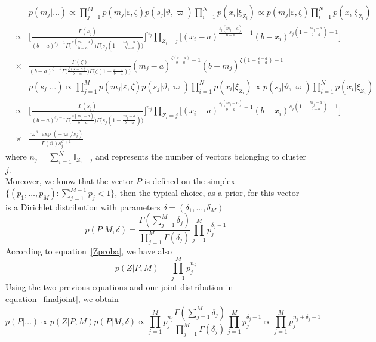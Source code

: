 \documentclass[journal,10pt]{elsart}
\begin{document}
\begin{eqnarray}\label{posteriormean}
\nonumber &&p(m_j|\ldots)\propto\prod_{j=1}^M p({m}_j|\varepsilon,\zeta)p(s_j|\vartheta,\varpi)\prod_{i=1}^Np(x_i|\xi_{Z_i})\propto p({m}_j|\varepsilon,\zeta)\prod_{i=1}^Np(x_i|\xi_{Z_i})\\
\nonumber &\propto& \bigg[\frac{\Gamma(s_j)}{(b-a)^{s_j-1}\Gamma\big(\frac{s(m_j-a)}{b-a}\big)\Gamma\big(s_j(1-\frac{m_j-a}{b-a})\big)}\bigg]^{n_j}\prod_{Z_i=j}\bigg[(x_i-a)^{\frac{s_j(m_j-a)}{b-a}-1}(b-x_i)^{s_j(1-\frac{m_j-a}{b-a})-1}\bigg]\\
&\times&\frac{\Gamma(\zeta)}{(b-a)^{\zeta-1}\Gamma\big(\frac{\zeta(\varepsilon-a)}{b-a}\big)\Gamma\big(\zeta(1-\frac{\varepsilon-a}{b-a})\big)}({m}_j-a)^{\frac{\zeta(\varepsilon-a)}{b-a}-1}(b-{m}_j)^{\zeta(1-\frac{\varepsilon-a}{b-a})-1}
\end{eqnarray}
\begin{eqnarray}\label{posteriorsum}
\nonumber &&p(s_j|\ldots)\propto\prod_{j=1}^M p({m}_j|\varepsilon,\zeta)p(s_j|\vartheta,\varpi)\prod_{i=1}^Np(x_i|\xi_{Z_i})\propto p(s_j|\vartheta,\varpi)\prod_{i=1}^Np(x_i|\xi_{Z_i})\\
\nonumber &\propto& \bigg[\frac{\Gamma(s_j)}{(b-a)^{s_j-1}\Gamma\big(\frac{s(m_j-a)}{b-a}\big)\Gamma\big(s_j(1-\frac{m_j-a}{b-a})\big)}\bigg]^{n_j}\prod_{Z_i=j}\bigg[(x_i-a)^{\frac{s_j(m_j-a)}{b-a}-1}(b-x_i)^{s_j(1-\frac{m_j-a}{b-a})-1}\bigg]\\
&\times&\frac{\varpi^\vartheta\exp(-\varpi/
s_j)}{\Gamma(\vartheta)s_j^{\vartheta+1}}
\end{eqnarray}
where
$n_j=\sum_{i=1}^N \mathbb{I}_{Z_{i}=j}$ and represents the number of vectors belonging to cluster $j$.\\
Moreover, we know that the
vector $P$ is defined on the simplex $\{(p_1,\ldots,p_M):
\sum_{j=1}^{M-1} p_j< 1\}$, then the typical choice, as a prior, for
this vector is a  Dirichlet distribution
with parameters $\delta=(\delta_1,\ldots,\delta_M)$ \cite{Robert2007}
\begin{equation}\label{Pprior}
p(P|M,\delta)=\frac{\Gamma(\sum_{j=1}^M\delta_j)}{\prod_{j=1}^{M}\Gamma(\delta_j)}\prod_{j=1}^{M}p_j^{\delta_j-1}
\end{equation}
According to equation~\ref{Zproba}, we have also
\begin{equation}
p(Z|P,M)=\prod_{j=1}^M p_j^{n_j}
\end{equation}
Using the two previous equations and our joint distribution in equation~\ref{finaljoint}, we obtain
\begin{equation}\label{mixinggeneration}
p(P|\ldots)\propto p(Z|P,M)p(P|M,\delta)\propto \prod_{j=1}^M p_j^{n_j}\frac{\Gamma(\sum_{j=1}^M\delta_j)}{\prod_{j=1}^{M}\Gamma(\delta_j)}\prod_{j=1}^{M}p_j^{\delta_j-1}\propto\prod_{j=1}^M p_j^{n_j+\delta_j-1}
\end{equation}
\end{document}
